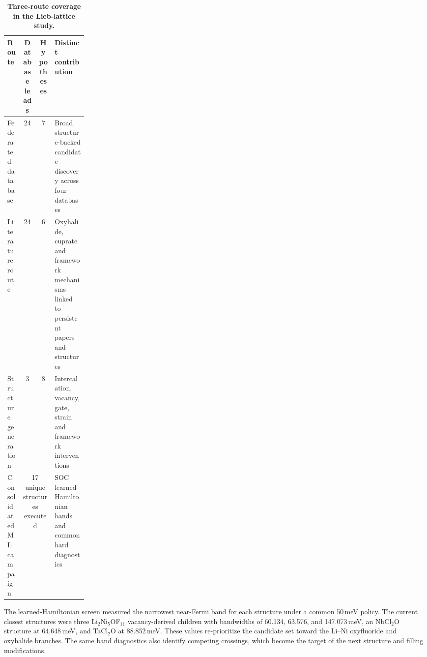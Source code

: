 \begin{table}[t]
    \centering
    \caption{\textbf{Three-route coverage in the Lieb-lattice study.}}
    \label{tab:lieb-routes}
    \small
    \setlength{\tabcolsep}{4pt}
    \renewcommand{\arraystretch}{1.13}
    \begin{tabularx}{\linewidth}{>{\raggedright\arraybackslash}p{0.19\linewidth}c c X}
        \toprule
        \textbf{Route} & \textbf{Database leads} & \textbf{Hypotheses} & \textbf{Distinct contribution} \\
        \midrule
        Federated database & 24 & 7 & Broad structure-backed candidate discovery across four databases \\
        Literature route & 24 & 6 & Oxyhalide, cuprate and framework mechanisms linked to persistent papers and structures \\
        Structure generation & 3 & 8 & Intercalation, vacancy, gate, strain and framework interventions \\
        \midrule
        Consolidated ML campaign & \multicolumn{2}{c}{17 unique structures executed} & SOC learned-Hamiltonian bands and common hard diagnostics \\
        \bottomrule
    \end{tabularx}
\end{table}

The learned-Hamiltonian screen measured the narrowest near-Fermi band for each structure under a common 50\,meV policy.  The current closest structures were three Li$_2$Ni$_5$OF$_{11}$ vacancy-derived children with bandwidths of 60.134, 63.576, and 147.073\,meV, an NbCl$_2$O structure at 64.648\,meV, and TaCl$_2$O at 88.852\,meV.  These values re-prioritize the candidate set toward the Li--Ni oxyfluoride and oxyhalide branches.  The same band diagnostics also identify competing crossings, which become the target of the next structure and filling modifications.

